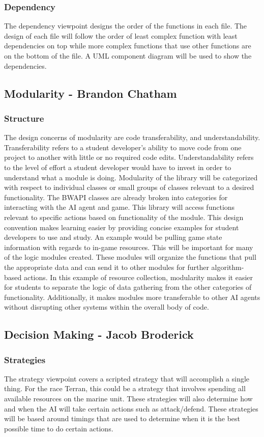 \subsubsection{Dependency}
	The dependency viewpoint designs the order of the functions in each file. The design of each file will follow the order of least complex function with least dependencies on top while more complex functions that use other functions are on the bottom of the file. A UML component diagram will be used to show the dependencies.
\subsection{Modularity - Brandon Chatham}
\subsubsection{Structure}
	The design concerns of modularity are code transferability, and understandability. Transferability refers to a student developer's ability to move code from one project to another with little or no required code edits. Understandability refers to the level of effort a student developer would have to invest in order to understand what a module is doing. Modularity of the library will be categorized with respect to individual classes or small groups of classes relevant to a desired functionality. The BWAPI classes are already broken into categories for interacting with the AI agent and game. This library will access functions relevant to specific actions based on functionality of the module. This design convention makes learning easier by providing concise examples for student developers to use and study.
	An example would be pulling game state information with regards to in-game resources. This will be important for many of the logic modules created. These modules will organize the functions that pull the appropriate data and can send it to other modules for further algorithm-based actions. In this example of resource collection, modularity makes it easier for students to separate the logic of data gathering from the other categories of functionality. Additionally, it makes modules more transferable to other AI agents without disrupting other systems within the overall body of code. 
\subsection{Decision Making - Jacob Broderick}
\subsubsection{Strategies}
	The strategy viewpoint covers a scripted strategy that will accomplish a single thing. For the race Terran, this could be a strategy that involves spending all available resources on the marine unit. These strategies will also determine how and when the AI will take certain actions such as attack/defend. These strategies will be based around timings that are used to determine when it is the best possible time to do certain actions.
